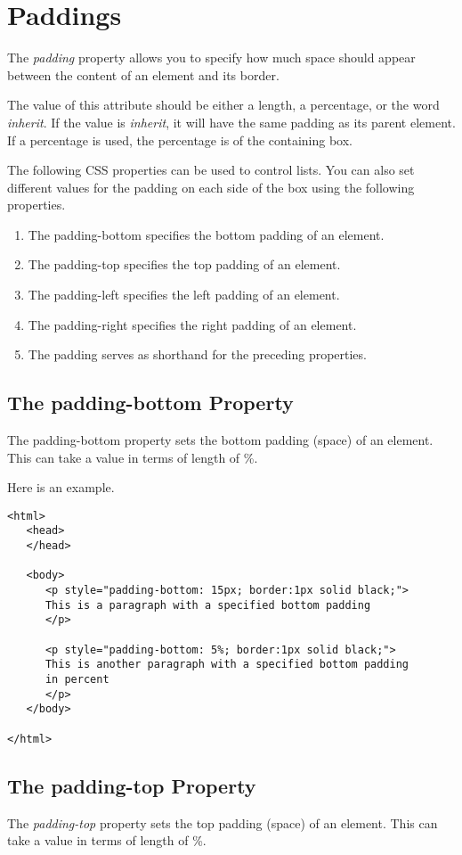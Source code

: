 \documentclass[a4paper,oneside]{book}
\numberwithin{equation}{chapter}
\begin{document}
\section{Paddings}
The \textit{padding} property allows you to specify how much space should appear between the content of an element and its border.

The value of this attribute should be either a length, a percentage, or the word \textit{inherit}. If the value is \textit{inherit}, it will have the same padding as its parent element. If a percentage is used, the percentage is of the containing box.

The following CSS properties can be used to control lists. You can also set different values for the padding on each side of the box using the following properties.
\begin{enumerate}
\item The padding-bottom specifies the bottom padding of an element.
\item The padding-top specifies the top padding of an element.
\item The padding-left specifies the left padding of an element.
\item The padding-right specifies the right padding of an element.
\item The padding serves as shorthand for the preceding properties.
\end{enumerate}
\subsection{The padding-bottom Property}
The padding-bottom property sets the bottom padding (space) of an element. This can take a value in terms of length of \%.

Here is an example.
\begin{verbatim}
<html>
   <head>
   </head>
   
   <body>
      <p style="padding-bottom: 15px; border:1px solid black;">
      This is a paragraph with a specified bottom padding
      </p>
      
      <p style="padding-bottom: 5%; border:1px solid black;">
      This is another paragraph with a specified bottom padding 
      in percent
      </p>
   </body>
   
</html> 
\end{verbatim}
\subsection{The padding-top Property}
The \textit{padding-top} property sets the top padding (space) of an element. This can take a value in terms of length of \%.
\end{document}
